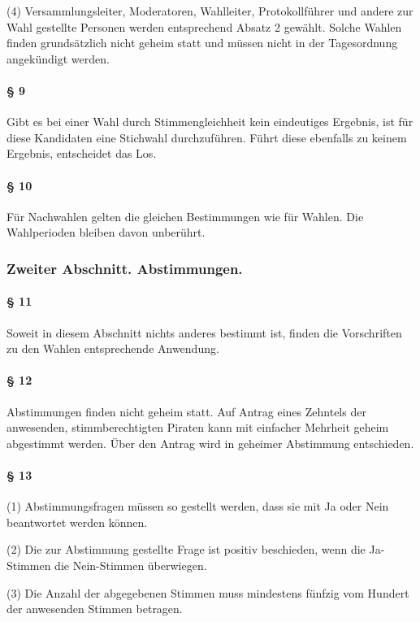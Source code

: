 (4) Versammlungsleiter, Moderatoren, Wahlleiter, Protokollführer und
andere zur Wahl gestellte Personen werden entsprechend Absatz 2 gewählt.
Solche Wahlen finden grundsätzlich nicht geheim statt und müssen nicht
in der Tagesordnung angekündigt werden.

\paragraph{§ 9}

Gibt es bei einer Wahl durch Stimmengleichheit kein eindeutiges
Ergebnis, ist für diese Kandidaten eine Stichwahl durchzuführen. Führt
diese ebenfalls zu keinem Ergebnis, entscheidet das Los.

\paragraph{§ 10}

Für Nachwahlen gelten die gleichen Bestimmungen wie für Wahlen. Die
Wahlperioden bleiben davon unberührt.

\subsubsection{Zweiter Abschnitt. Abstimmungen.}

\paragraph{§ 11}

Soweit in diesem Abschnitt nichts anderes bestimmt ist, finden die
Vorschriften zu den Wahlen entsprechende Anwendung.

\paragraph{§ 12}

Abstimmungen finden nicht geheim statt. Auf Antrag eines Zehntels der
anwesenden, stimmberechtigten Piraten kann mit einfacher Mehrheit geheim
abgestimmt werden. Über den Antrag wird in geheimer Abstimmung
entschieden.

\paragraph{§ 13}

(1) Abstimmungsfragen müssen so gestellt werden, dass sie mit Ja oder
Nein beantwortet werden können.

(2) Die zur Abstimmung gestellte Frage ist positiv beschieden, wenn die
Ja-Stimmen die Nein-Stimmen überwiegen.

(3) Die Anzahl der abgegebenen Stimmen muss mindestens fünfzig vom
Hundert der anwesenden Stimmen betragen.
